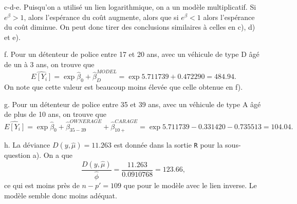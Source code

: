 \begin{solution}{5.8}
\begin{enumerate}
c-d-e. Puisqu'on a utilisé un lien logarithmique, on a un modèle multiplicatif. Si $e^\beta>1$, alors l'espérance du coût augmente, alors que si $e^\beta<1$ alors l'espérance du coût diminue. On peut donc tirer des conclusions similaires à celles en c), d) et e).

f. Pour un détenteur de police entre 17 et 20 ans, avec un véhicule de type D âgé de un à 3 ans, on trouve que $$\widehat{E[Y_i]}=\exp{\hat{\beta}_0+\hat{\beta}^{MODEL}_D}=\exp{5.711739+0.472290}=484.94.$$ On note que cette valeur est beaucoup moins élevée que celle obtenue en f).

g. Pour un détenteur de police entre 35 et 39 ans, avec un véhicule de type A âgé de plus de 10 ans, on trouve que $$\widehat{E[Y_i]}=\exp{\hat{\beta}_0+\hat{\beta}^{OWNERAGE}_{35-39}+\hat{\beta}^{CARAGE}_{10+}}=\exp{5.711739-0.331420-0.735513}=104.04.$$

h. La déviance $D(y,\hat{\mu})=11.263$ est donnée dans la sortie \texttt{R} pour la sous-question a). On a que $$\frac{D(y,\hat{\mu})}{\hat{\phi}}=\frac{11.263}{0.0910768}=123.66,$$ ce qui est moins près de $n-p'=109$ que pour le modèle avec le lien inverse. Le modèle semble donc moins adéquat.
\end{enumerate}
\end{solution}
